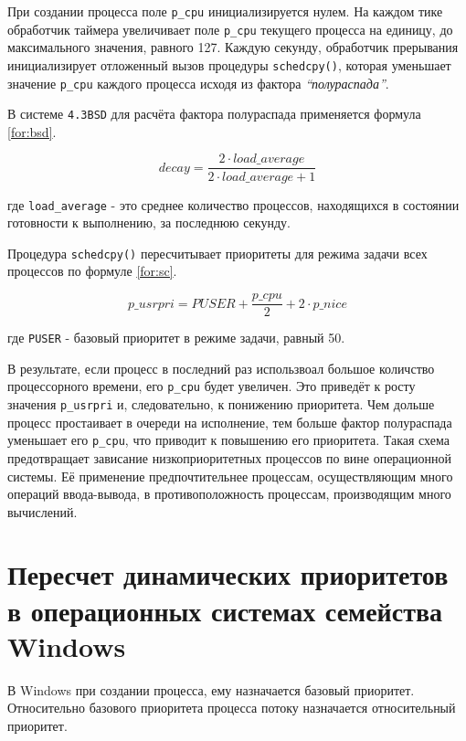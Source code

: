 При создании процесса поле \texttt{p\_cpu} инициализируется нулем. На каждом тике обработчик таймера увеличивает поле \texttt{p\_cpu} текущего процесса на единицу, до максимального значения, равного 127. Каждую секунду, обработчик прерывания инициализирует отложенный вызов процедуры \texttt{schedcpy()}, которая уменьшает значение \texttt{p\_cpu} каждого процесса исходя из фактора \textit{``полураспада''}.

В системе \texttt{4.3BSD} для расчёта фактора полураспада применяется формула \eqref{for:bsd}.

\begin{equation}
    \label{for:bsd}
    decay = \frac{2 \cdot load\_average}{2 \cdot load\_average + 1}
\end{equation}

где \texttt{load\_average} - это среднее количество процессов, находящихся в состоянии готовности к выполнению, за последнюю секунду.

Процедура \texttt{schedcpy()} пересчитывает приоритеты для режима задачи всех процессов по формуле \eqref{for:sc}.

\begin{equation}
    \label{for:sc}
    p\_usrpri = PUSER + \frac{p\_cpu}{2} + 2 \cdot p\_nice
\end{equation}

где \texttt{PUSER} - базовый приоритет в режиме задачи, равный 50.

В результате, если процесс в последний раз использвоал большое количство процессорного времени, его \texttt{p\_cpu} будет увеличен. Это приведёт к росту значения \texttt{p\_usrpri} и, следовательно, к понижению приоритета. Чем дольше процесс простаивает в очереди на исполнение, тем больше фактор полураспада уменьшает его \texttt{p\_cpu}, что приводит к повышению его приоритета. Такая схема предотвращает зависание низкоприоритетных процессов по вине операционной системы. Её применение предпочтительнее процессам, осуществляющим много операций ввода-вывода, в противоположность процессам, производящим много вычислений.



\section{Пересчет динамических приоритетов в операционных системах семейства Windows}

В Windows при создании процесса, ему назначается базовый приоритет. Относительно базового приоритета процесса потоку назначается относительный приоритет.

